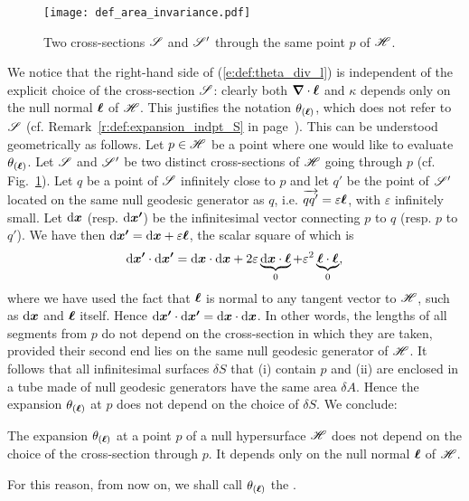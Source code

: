 \begin{figure}
\centerline{\texttt{[image: def\_area\_invariance.pdf]}}
\caption[]{\label{f:def:two_cross_sections} \footnotesize
Two cross-sections $\mathscr{S}$ and $\mathscr{S}'$ through the same point $p$ of $\mathscr{H}$.}
\end{figure}



We notice that the right-hand side of (\ref{e:def:theta_div_l}) is independent of the
explicit choice of the cross-section $\mathscr{S}$: clearly both $\bm{\nabla}\cdot\bm{\ell}$
and $\kappa$ depends only on the null normal $\bm{\ell}$ of $\mathscr{H}$. This justifies
the notation $\theta_{(\bm{\ell})}$, which does not refer to $\mathscr{S}$
(cf. Remark~\ref{r:def:expansion_indpt_S} in page~\pageref{r:def:expansion_indpt_S}).
This can be understood geometrically as follows. Let $p\in\mathscr{H}$ be a
point where one would like to evaluate $\theta_{(\bm{\ell})}$. Let $\mathscr{S}$ and $\mathscr{S}'$
be two distinct cross-sections of $\mathscr{H}$ going through $p$
(cf. Fig.~\ref{f:def:two_cross_sections}). Let $q$ be a point of $\mathscr{S}$ infinitely close to $p$ and let $q'$
be the point of $\mathscr{S}'$ located on the same null geodesic generator as $q$,
i.e. $\overrightarrow{qq'} = \varepsilon \bm{\ell}$, with $\varepsilon$ infinitely small.
Let $\mathrm{d}\bm{x}$ (resp. $\mathrm{d}\bm{x'}$) be the infinitesimal vector connecting
$p$ to $q$ (resp. $p$ to $q'$). We have then
$\mathrm{d}\bm{x'} = \mathrm{d}\bm{x} + \varepsilon \bm{\ell}$,
the scalar square of which is
\[
    \mathrm{d}\bm{x'}\cdot\mathrm{d}\bm{x'} =\mathrm{d}\bm{x}\cdot\mathrm{d}\bm{x}
            + 2 \varepsilon \underbrace{\mathrm{d}\bm{x}\cdot \bm{\ell}}_{0}
            + \varepsilon^2 \underbrace{\bm{\ell}\cdot \bm{\ell}}_{0},
\]
where we have used the fact that $\bm{\ell}$ is normal to any tangent vector to $\mathscr{H}$,
such as $\mathrm{d}\bm{x}$ and $\bm{\ell}$ itself. Hence
$\mathrm{d}\bm{x'}\cdot\mathrm{d}\bm{x'} = \mathrm{d}\bm{x}\cdot\mathrm{d}\bm{x}$.
In other words, the lengths of all segments from $p$ do not depend
on the cross-section in which they are taken, provided their second end
lies on the same null geodesic generator of $\mathscr{H}$. It follows that all infinitesimal surfaces
$\delta S$ that (i) contain $p$ and (ii) are enclosed in a tube made of null geodesic generators have the same
area $\delta A$. Hence the expansion $\theta_{(\bm{\ell})}$ at $p$
does not depend on the choice of $\delta S$.
We conclude:
\begin{prop}
The expansion $\theta_{(\bm{\ell})}$ at a point $p$ of a null hypersurface $\mathscr{H}$
does not depend on the choice of the cross-section through $p$.
It depends  only on the null normal $\bm{\ell}$ of $\mathscr{H}$.
\end{prop}
For this reason, from now on, we shall call $\theta_{(\bm{\ell})}$
the .

